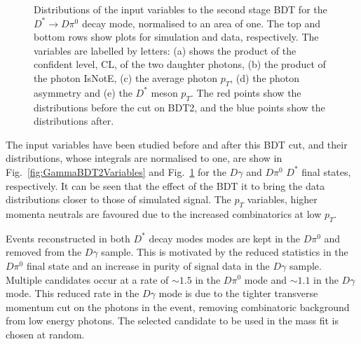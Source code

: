 \documentclass[oneside,12pt]{article}
\begin{document}
\begin{figure}[H]
\begin{tikzpicture}[scale=0.19]
\end{tikzpicture}
\caption{{Distributions of the input variables to the second stage BDT for
the $D^* \rightarrow D\pi^0$ decay mode, normalised to an area of one. The top
and bottom rows show plots for simulation and data, respectively. The variables
are labelled by letters: (a) shows the product of the confident level, CL, of
the two daughter photons, (b) the product of the photon IsNotE, (c) the average
photon $p_T$, (d) the photon asymmetry and (e) the $D^*$ meson $p_T$. The red
points show the distributions before the cut on BDT2, and the blue points show
the distributions after.}} \label{fig:Pi0BDT2Variables}
\end{figure}

The input variables have been studied before and after this BDT cut, and their
distributions, whose integrals are normalised to one, are show in
Fig.~\ref{fig:GammaBDT2Variables} and Fig.~\ref{fig:Pi0BDT2Variables} for the
$D\gamma$ and $D\pi^0$ $D^*$ final states, respectively. It can be seen that the
effect of the BDT it to bring the data distributions closer to those of
simulated signal.  The $p_T$ variables, higher momenta neutrals are favoured due
to the increased combinatorics at low $p_T$.

Events reconstructed in both $D^{*}$ decay modes modes are kept in the $D\pi^0$
and removed from the $D\gamma$ sample. This is motivated by the reduced
statistics in the $D\pi^0$ final state and an increase in purity of signal data
in the $D\gamma$ sample. Multiple candidates occur at a rate of $\sim 1.5$ in
the $D\pi^0$ mode and $\sim 1.1$ in the $D\gamma$ mode. This reduced rate in the
$D\gamma$ mode is due to the tighter transverse momentum cut on the photons in
the event, removing combinatoric background from low energy photons. The
selected candidate to be used in the mass fit is chosen at random.
\end{document}
